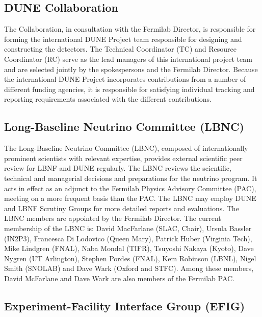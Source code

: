 \subsection{DUNE Collaboration}	

The Collaboration, in consultation with the Fermilab Director,
is responsible for forming the international DUNE Project team 
responsible for designing and constructing the detectors.  
The Technical Coordinator
(TC) and Resource Coordinator (RC) serve as the lead managers
of this international project team and are selected jointly by
the spokespersons and the Fermilab Director.  Because the international DUNE
Project incorporates contributions from a number of different
funding agencies, it %
is responsible for
satisfying individual tracking and reporting requirements associated
with %
the different contributions.

\subsection{Long-Baseline Neutrino Committee (LBNC)}

The Long-Baseline Neutrino Committee (LBNC), composed
of internationally prominent scientists with relevant expertise,
provides external scientific peer review for LBNF and DUNE %
regularly.
The LBNC reviews the scientific, technical and managerial
decisions and preparations for the neutrino program.
It acts in effect %
as an adjunct to the Fermilab Physics Advisory Committee
(PAC), meeting on a more frequent basis than the PAC.
The LBNC may employ DUNE and LBNF Scrutiny Groups for more
detailed reports and evaluations. The LBNC members are appointed by the
Fermilab Director. The current membership of the LBNC is:
%
David MacFarlane (SLAC, Chair),
Ursula Bassler (IN2P3),
Francesca Di Lodovico (Queen Mary),
Patrick Huber (Virginia Tech),
Mike Lindgren (FNAL),
Naba Mondal (TIFR),
Tsuyoshi Nakaya (Kyoto),
Dave Nygren (UT Arlington),
Stephen Pordes (FNAL),
Kem Robinson (LBNL),
Nigel Smith (SNOLAB) and
Dave Wark (Oxford and STFC).
%
Among these members, David McFarlane and Dave Wark are also members of the Fermilab PAC.

\subsection{Experiment-Facility Interface Group (EFIG)}

